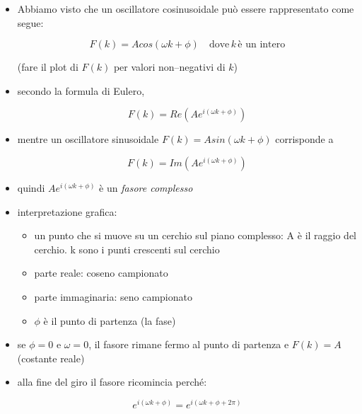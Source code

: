 \begin{itemize}

  \item Abbiamo visto che un oscillatore cosinusoidale pu\`o essere rappresentato come
segue:

\begin{equation}
  F(k) = A cos(\omega k + \phi)\quad \textrm{dove}\,k\,\textrm{\`e un intero}
\end{equation}

(fare il plot di $F(k)$ per valori non--negativi di $k$)

  \item secondo la formula di Eulero,
	
		 \begin{equation}
				F(k) = Re \left ( A e^{i(\omega k + \phi)} \right )
		 \end{equation}

	\item mentre un oscillatore sinusoidale $F(k) = A sin ( \omega k + \phi)$
					corrisponde a
	
		 \begin{equation}
				F(k) = Im \left ( A e^{i(\omega k + \phi)} \right )
		 \end{equation}

	\item quindi $A e^{i(\omega k+ \phi)}$ \`e un \emph{fasore complesso}

  \item interpretazione grafica:
	
		\begin{itemize}

			\item un punto che si muove su un cerchio sul piano
  complesso: A \`e il raggio del cerchio. k sono i punti crescenti sul cerchio

			\item parte reale: coseno campionato

			\item parte immaginaria: seno campionato

			\item $\phi$ \`e il punto di partenza (la fase)

		\end{itemize}

	\item se $\phi = 0$ e $\omega = 0$, il fasore rimane fermo al punto di partenza e $F(k) = A$ (costante reale)

  \item alla fine del giro il fasore ricomincia perch\'e:

		\begin{equation}
  		e^{i(\omega k+ \phi)} = e^{i(\omega k + \phi + 2 \pi)}
		\end{equation}

\end{itemize}

